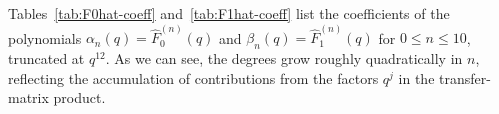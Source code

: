\documentclass[letterpaper,12pt]{article}
\begin{document}
 Tables~\ref{tab:F0hat-coeff} and~\ref{tab:F1hat-coeff} 
list the coefficients of the polynomials 
$\alpha_n(q)=\widehat F^{(n)}_0(q)$ and $\beta_n(q)=\widehat F^{(n)}_1(q)$ 
for $0\le n\le 10$, truncated at $q^{12}$. As we can see, the degrees grow roughly quadratically in $n$, 
reflecting the accumulation of contributions from the factors $q^j$ 
in the transfer-matrix product.

\end{document}
